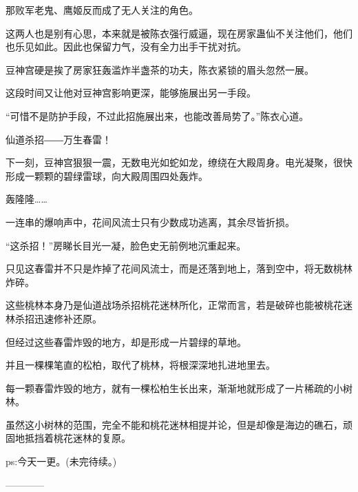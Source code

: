 \begin{this_body}
那败军老鬼、鹰姬反而成了无人关注的角色。

这两人也是别有心思，本来就是被陈衣强行威逼，现在房家蛊仙不关注他们，他们也乐见如此。因此也保留力气，没有全力出手干扰对抗。

豆神宫硬是挨了房家狂轰滥炸半盏茶的功夫，陈衣紧锁的眉头忽然一展。

这段时间又让他对豆神宫影响更深，能够施展出另一手段。

“可惜不是防护手段，不过此招施展出来，也能改善局势了。”陈衣心道。

仙道杀招――万生春雷！

下一刻，豆神宫狠狠一震，无数电光如蛇如龙，缭绕在大殿周身。电光凝聚，很快形成一颗颗的碧绿雷球，向大殿周围四处轰炸。

轰隆隆……

一连串的爆响声中，花间风流士只有少数成功逃离，其余尽皆折损。

“这杀招！”房睇长目光一凝，脸色史无前例地沉重起来。

只见这春雷并不只是炸掉了花间风流士，而是还落到地上，落到空中，将无数桃林炸碎。

这些桃林本身乃是仙道战场杀招桃花迷林所化，正常而言，若是破碎也能被桃花迷林杀招迅速修补还原。

但经过这些春雷炸毁的地方，却是形成一片碧绿的草地。

并且一棵棵笔直的松柏，取代了桃林，将根深深地扎进地里去。

每一颗春雷炸毁的地方，就有一棵松柏生长出来，渐渐地就形成了一片稀疏的小树林。

虽然这小树林的范围，完全不能和桃花迷林相提并论，但是却像是海边的礁石，顽固地抵挡着桃花迷林的复原。

ps:今天一更。(未完待续。)

------------

\end{this_body}

